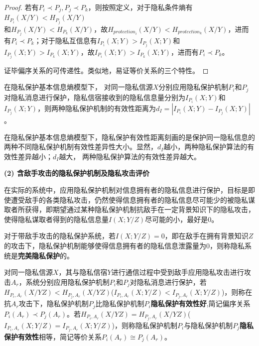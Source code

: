 \begin{proof}
	若有$P_{i}\prec P_{j},P_{j}\prec P_{k}$，则按照定义，对于隐私条件熵有$H_{P_{i}}(X/Y)< H_{P_{j}}(X/Y)$\\和$H_{P_{j}}(X/Y)< H_{P_{k}}(X/Y)$，故$H_{protection_{i}}(X/Y)< H_{protection_{k}}(X/Y)$，进而有$P_{i}\prec P_{k}$；对于隐私互信息有$I_{P_{i}}(X;Y)>I_{P_{j}}(X;Y)$和$I_{P_{j}}(X;Y)>I_{P_{k}}(X;Y)$，故$I_{P_{i}}(X;Y)>I_{P_{k}}(X;Y)$，进而有$P_{i}\prec P_{k}$。
	
	证毕偏序关系的可传递性。类似地，易证等价关系的三个特性。
\end{proof}


\begin{definition}[隐私保护有效性距离]
	\label{def:privacy-preserving-distance} 
	在隐私保护基本信息熵模型下， 对同一隐私信源$X$分别应用隐私保护机制$P_{i}$和$P_{j}$对隐私消息进行保护，隐私信宿接收到的隐私信息量分别为$I_{P_{i}}(X;Y)$和$I_{P_{j}}(X;Y)$，则两种隐私保护机制的有效性距离为$d_{I}=\left | I_{P_{i}}(X;Y)-I_{P_{j}}(X;Y) \right |$。
\end{definition}

在隐私保护基本信息熵模型下，隐私保护有效性距离刻画的是保护同一隐私信息的两种不同隐私保护机制有效性差异性大小。显然，$d_{I}$越小，两种隐私保护算法的有效性差异越小；$d_{I}$越大， 两种隐私保护算法的有效性差异越大。

\textbf{(2) 含敌手攻击的隐私保护机制及隐私攻击评价}

在实际的系统中，应用隐私保护机制对信息拥有者的隐私信息进行保护，目标是即使遭受敌手的各类隐私攻击，仍然使得信息拥有者的隐私信息尽可能少的被隐私谋取者所获得，即期望通过某种隐私保护机制抗敌手在一定背景知识下的隐私攻击，使得隐私谋取者得到的隐私信息量$I(X;Y/Z)$尽可能的小，最好是0。

\begin{definition}
	\label{def:perfect-privacy-preserving}
	 对于带敌手攻击的隐私保护系统，若$I(X;Y/Z)=0$，即在敌手在拥有背景知识$Z$的攻击下，隐私保护机制能够使得信息拥有者的隐私信息泄露量为0，则称隐私系统是\textbf{完美隐私保护}的。
\end{definition}


\begin{definition}
	\label{def:privacy-preserving-performance}
	对同一隐私信源$X$，其与隐私信宿$Y$进行通信过程中受到敌手应用隐私攻击进行攻击$A_{r}$，系统分别应用隐私保护机制$P_{i}$和$P_{j}$对隐私消息进行保护，若$H_{P_{i},A_{r}}(X/YZ)<H_{P_{j},A_{r}}(X/YZ)$($I_{P_{i},A_{r}}(X;Y/Z)<I_{P_{j},A_{r}}(X;Y/Z)$)，则称在抗$A_{r}$攻击下，隐私保护机制$P_{j}$比隐私保护机制$P_{i}$\textbf{隐私保护有效性好},简记偏序关系$P_{i}(A_{r})\prec P_{j}(A_{r})$。若$H_{P_{i},A_{r}}(X/YZ)=H_{P_{j},A_{r}}(X/YZ)$($I_{P_{i},A_{r}}(X;Y/Z)=I_{P_{j},A_{r}}(X;Y/Z)$)，则称隐私保护机制$P_{i}$与隐私保护机制$P_{j}$\textbf{隐私保护有效性}相等，简记等价关系$P_{i}(A_{r})\cong P_{j}(A_{r})$。
\end{definition}

